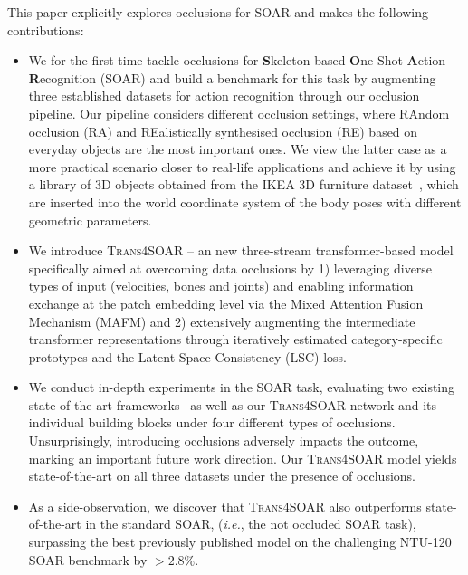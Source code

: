 \documentclass[lettersize,journal]{IEEEtran}
\begin{document}
This paper explicitly explores occlusions for SOAR and makes the following contributions:
\begin{itemize}
    \item We for the first time tackle occlusions for \textbf{S}keleton-based \textbf{O}ne-Shot \textbf{A}ction \textbf{R}ecognition (SOAR) and build a benchmark for this task by augmenting three established datasets for action recognition through our occlusion pipeline. Our pipeline considers different occlusion settings, where RAndom occlusion (RA) and REalistically synthesised occlusion (RE) based on everyday objects are the most important ones. We view the latter case as a more practical scenario closer to real-life applications and achieve it by using a library of 3D objects obtained from the IKEA 3D furniture dataset~\cite{sun2018pix3d}, which are inserted into the world coordinate system of the body poses with different geometric parameters.

    \item We introduce \textsc{Trans4SOAR} -- an new three-stream transformer-based model specifically aimed at overcoming data occlusions by 1) leveraging diverse types of input (velocities, bones and joints) and enabling information exchange at the patch embedding level via the Mixed Attention Fusion Mechanism (MAFM) and 2) extensively augmenting the intermediate transformer representations through iteratively estimated category-specific prototypes and the Latent Space Consistency (LSC) loss.
     
    \item  We conduct in-depth experiments in the SOAR task, evaluating two existing state-of-the art frameworks~\cite{memmesheimer2021sl, memmesheimer2020skeleton_dml} as well as our \textsc{Trans4SOAR} network and its individual building blocks under four different types of occlusions. Unsurprisingly, introducing occlusions adversely impacts the outcome, marking an important future work direction. Our \textsc{Trans4SOAR} model yields state-of-the-art on all three datasets under the presence of occlusions.
    
    \item As a side-observation, we discover that \textsc{Trans4SOAR} also outperforms state-of-the-art in the standard SOAR, (\textit{i.e.}, the not occluded SOAR task), surpassing the best previously published model on the challenging NTU-120 SOAR benchmark by $>2.8\%$.
\end{itemize}
\end{document}
